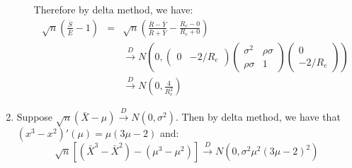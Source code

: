 \documentclass[12pt]{article}
\newcommand{\cd}{\overset{D}{\to}}
\begin{document}
\begin{enumerate}
\begin{enumerate}[(a)]
        Therefore by delta method, we have:
        \begin{eqnarray}
            \sqrt{n}(\frac{\bar{S}}{\bar{E}} - 1) &=& \sqrt{n}(\frac{\bar{R} - \bar{Y}}{\bar{R} + \bar{Y}} - \frac{R_e - 0}{R_e + 0}) \\
            &&\cd N(0, \begin{pmatrix} 0 & -2/R_e \end{pmatrix} \begin{pmatrix}
            \sigma^2 & \rho \sigma \\
            \rho \sigma & 1                
            \end{pmatrix} \begin{pmatrix} 0 \\ -2/R_e \end{pmatrix})  \\
            &&\cd N(0, \frac{4}{R_e^2})
        \end{eqnarray}
    \end{enumerate}

    \item
    Suppose $\sqrt{n} (\bar{X} - \mu) \cd N(0,\sigma^2)$. Then by delta method, we have that $(x^3-x^2)'(\mu) = \mu(3\mu-2)$ and:
    $$\sqrt{n} [(\bar{X}^3 - \bar{X}^2) - (\mu^3 - \mu^2)] \cd N(0,\sigma^2 \mu^2 (3\mu -2)^2 )$$
\end{enumerate}
    
\end{document}
